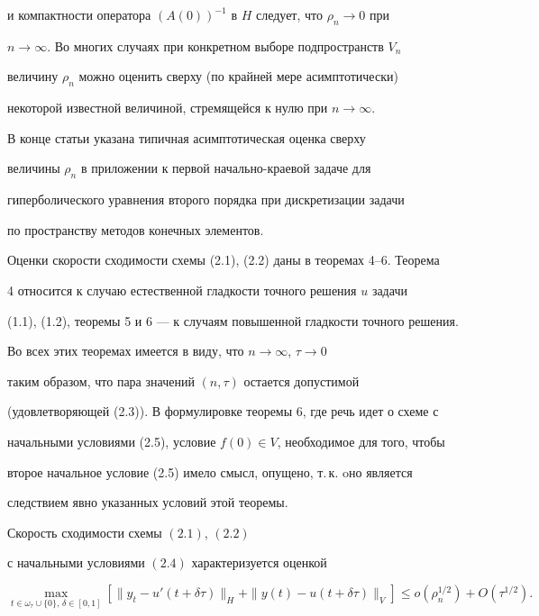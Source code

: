 и компактности оператора $(A(0))^{-1}$ в $H$ следует, что $\rho_n\to0$ при


$n\to\infty$. Во многих случаях при конкретном выборе подпространств $V_n$


величину $\rho_n$ можно оценить сверху (по крайней мере асимптотически)


некоторой известной величиной, стремящейся к нулю при $n\to\infty$.


В конце статьи указана типичная асимптотическая оценка сверху


величины $\rho_n$ в приложении к первой начально-краевой задаче для


гиперболического уравнения второго порядка при дискретизации задачи


по пространству методов конечных элементов.





Оценки скорости сходимости схемы (2.1), (2.2) даны в теоремах 4--6. Теорема


4 относится к случаю естественной гладкости точного решения $u$ задачи


(1.1), (1.2), теоремы 5 и 6 --- к случаям повышенной гладкости точного решения.


Во всех этих теоремах имеется в виду, что $n\to\infty$, $\tau\to0$


таким образом, что пара значений $(n,\tau)$ остается допустимой


(удовлетворяющей (2.3)). В формулировке теоремы 6, где речь идет о схеме с


начальными условиями (2.5), условие $f(0)\in V$, необходимое для того, чтобы


второе начальное условие (2.5) имело смысл, опущено, т.\,к. oно является


следствием явно указанных условий этой теоремы.





\begin{thm}


Скорость сходимости схемы $(2.1)$, $(2.2)$


с начальными условиями $(2.4)$ характеризуется оценкой


\begin{equation}


\max\limits_{t\in\omega_{\tau}\cup\{0\},\,\delta\in[0,1]}[\|y_t-


u'(t+\delta\tau)\|_H+\|y(t)-u(t+\delta\tau)\|_V]


\le o(\rho_n^{1/2})+O(\tau^{1/2}).


\end{equation}


\end{thm}





